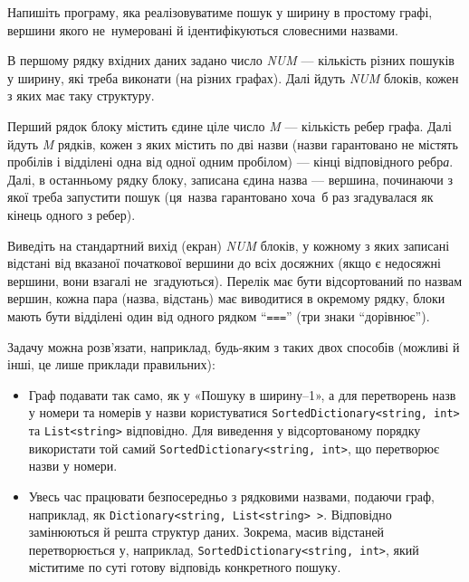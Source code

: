 ﻿Напишіть програму, яка реалізовуватиме пошук у ширину в простому графі, вершини якого не~нумеровані й ідентифікуються словесними назвами.

\InputFile
В першому рядку вхідних даних задано число {\it NUM} --- кількість різних пошуків у ширину, які треба виконати (на різних графах). Далі йдуть {\it NUM} блоків, кожен з яких має таку структуру.

Перший рядок блоку містить єдине ціле число {\it M} --- кількість ребер графа. Далі йдуть {\it M} рядків, кожен з яких містить по дві назви (назви гарантовано не містять пробілів і відділені одна від одної одним пробілом) --- кінці відповідного ребр{\it а}. Далі, в останньому рядку блоку, записана єдина назва --- вершина, починаючи з якої треба запустити пошук (ця~назва гарантовано хоча~б раз згадувалася як кінець одного з ребер).

\OutputFile
Виведіть на стандартний вихід (екран) {\it NUM} блоків, у кожному з яких записані відстані від вказаної початкової вершини до всіх досяжних (якщо є недосяжні вершини, вони взагалі не~згадуються). Перелік має бути відсортований по назвам вершин, кожна пара (назва, відстань) має виводитися в окремому рядку, блоки мають бути відділені один від одного рядком ``{\tt ===}'' (три знаки ``дорівнює'').

\Examples

\begin{example}
\end{example}


\Note

Задачу можна розв’язати, наприклад, будь-яким з таких двох способів (можливі й інші, це лише приклади правильних):
\begin{itemize}
\item
Граф подавати так само, як у «Пошуку в ширину–1», а для перетворень назв у номери та номерів у назви користуватися {\tt SortedDictionary<string, int>} та {\tt List<string>} відповідно. Для виведення у відсортованому порядку використати той самий {\tt SortedDictionary<string, int>}, що перетворює назви у номери.
\item
Увесь час працювати безпосередньо з рядковими назвами, подаючи граф, наприклад, як {\tt Dictionary<string, List<string>~>}. Відповідно замінюються й решта структур даних. Зокрема, масив відстаней перетворюється у, наприклад, {\tt SortedDictionary<string, int>}, який міститиме по суті готову відповідь конкретного пошуку.
\end{itemize}
